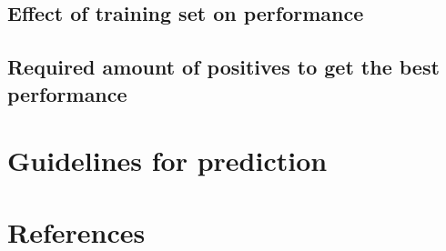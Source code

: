 \documentclass[11pt]{article}
\begin{document}
\hypertarget{effect-of-training-set-on-performance}{%
\subsection{Effect of training set on
performance}\label{effect-of-training-set-on-performance}}

\hypertarget{required-amount-of-positives-to-get-the-best-performance}{%
\subsection{Required amount of positives to get the best
performance}\label{required-amount-of-positives-to-get-the-best-performance}}

\hypertarget{guidelines-for-prediction}{%
\section{Guidelines for prediction}\label{guidelines-for-prediction}}

\hypertarget{references}{%
\section*{References}\label{references}}
\end{document}
